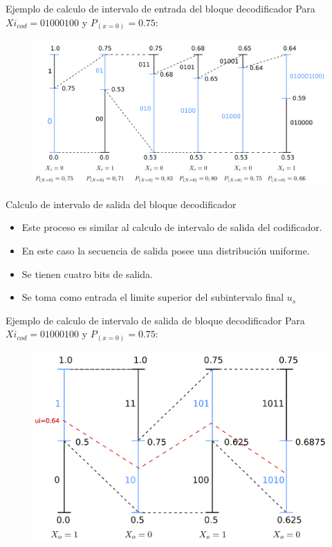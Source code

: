 \documentclass[xcolor=table]{beamer}
\begin{document}
\begin{frame}{Ejemplo de calculo de intervalo de entrada del bloque decodificador}
Para $Xi_{cod} = 01000100$ y  $P_{(x=0)}=0.75$:
\begin{figure}[H]
  \centering
  \includegraphics[width=0.85\paperwidth]{Diagramas/int_ent_dec.png}%
\end{figure}
\end{frame}

\begin{frame}{Calculo de intervalo de salida del bloque decodificador}
\begin{itemize}
    \item Este proceso  es similar al calculo de intervalo de salida del codificador.
    \item  En este caso la secuencia de salida posee una distribución uniforme.
    \item  Se tienen cuatro bits de salida.
    \item Se toma como entrada el limite superior del subintervalo final $u_s$
\end{itemize}
\end{frame}

\begin{frame}{Ejemplo de calculo de intervalo de salida de bloque decodificador}
Para $Xi_{cod} = 01000100$ y  $P_{(x=0)}=0.75$:
\begin{figure}[H]
  \centering
  \includegraphics[width=0.70\paperwidth]{Diagramas/int_sal_dec.png}%
\end{figure}
\end{frame}
\end{document}
